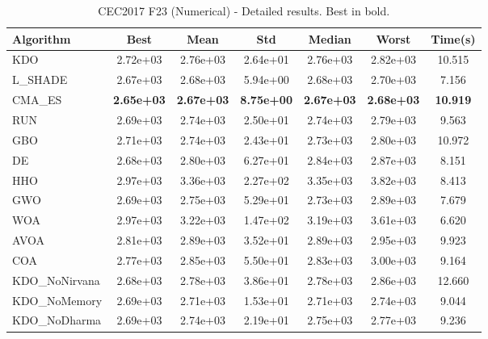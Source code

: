 \begin{table}[H]
\centering\small
\caption{CEC2017 F23 (Numerical) - Detailed results. Best in bold.}
\label{tab:cec2017_F23}
\begin{tabular}{lcccccc}
\toprule
\textbf{Algorithm} & \textbf{Best} & \textbf{Mean} & \textbf{Std} & \textbf{Median} & \textbf{Worst} & \textbf{Time(s)} \\
\midrule
KDO & 2.72e+03 & 2.76e+03 & 2.64e+01 & 2.76e+03 & 2.82e+03 & 10.515 \\
L_SHADE & 2.67e+03 & 2.68e+03 & 5.94e+00 & 2.68e+03 & 2.70e+03 & 7.156 \\
CMA_ES & \textbf{2.65e+03} & \textbf{2.67e+03} & \textbf{8.75e+00} & \textbf{2.67e+03} & \textbf{2.68e+03} & \textbf{10.919} \\
RUN & 2.69e+03 & 2.74e+03 & 2.50e+01 & 2.74e+03 & 2.79e+03 & 9.563 \\
GBO & 2.71e+03 & 2.74e+03 & 2.43e+01 & 2.73e+03 & 2.80e+03 & 10.972 \\
DE & 2.68e+03 & 2.80e+03 & 6.27e+01 & 2.84e+03 & 2.87e+03 & 8.151 \\
HHO & 2.97e+03 & 3.36e+03 & 2.27e+02 & 3.35e+03 & 3.82e+03 & 8.413 \\
GWO & 2.69e+03 & 2.75e+03 & 5.29e+01 & 2.73e+03 & 2.89e+03 & 7.679 \\
WOA & 2.97e+03 & 3.22e+03 & 1.47e+02 & 3.19e+03 & 3.61e+03 & 6.620 \\
AVOA & 2.81e+03 & 2.89e+03 & 3.52e+01 & 2.89e+03 & 2.95e+03 & 9.923 \\
COA & 2.77e+03 & 2.85e+03 & 5.50e+01 & 2.83e+03 & 3.00e+03 & 9.164 \\
KDO_NoNirvana & 2.68e+03 & 2.78e+03 & 3.86e+01 & 2.78e+03 & 2.86e+03 & 12.660 \\
KDO_NoMemory & 2.69e+03 & 2.71e+03 & 1.53e+01 & 2.71e+03 & 2.74e+03 & 9.044 \\
KDO_NoDharma & 2.69e+03 & 2.74e+03 & 2.19e+01 & 2.75e+03 & 2.77e+03 & 9.236 \\
\bottomrule
\end{tabular}
\end{table}
